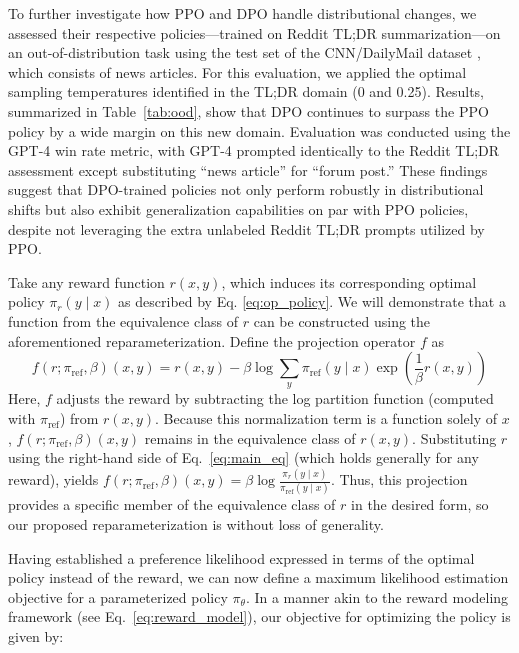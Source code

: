 To further investigate how PPO and DPO handle distributional changes, we assessed their respective policies—trained on Reddit TL;DR summarization—on an out-of-distribution task using the test set of the CNN/DailyMail dataset \citep{nallapati-etal-2016-abstractive}, which consists of news articles. For this evaluation, we applied the optimal sampling temperatures identified in the TL;DR domain (0 and 0.25). Results, summarized in Table~\ref{tab:ood}, show that DPO continues to surpass the PPO policy by a wide margin on this new domain. Evaluation was conducted using the GPT-4 win rate metric, with GPT-4 prompted identically to the Reddit TL;DR assessment except substituting “news article” for “forum post.” These findings suggest that DPO-trained policies not only perform robustly in distributional shifts but also exhibit generalization capabilities on par with PPO policies, despite not leveraging the extra unlabeled Reddit TL;DR prompts utilized by PPO.

\begin{sproof}
    Take any reward function $r(x, y)$, which induces its corresponding optimal policy $\pi_r(y \mid x)$ as described by Eq. \ref{eq:op_policy}. We will demonstrate that a function from the equivalence class of $r$ can be constructed using the aforementioned reparameterization. Define the projection operator $f$ as  
\begin{equation}
    f(r; \pi_\text{ref}, \beta)(x, y) = r(x, y) - \beta\log\sum_{y}\pi_\text{ref}(y\mid x)\exp\left(\frac{1}{\beta}r(x, y)\right)
\end{equation}
Here, $f$ adjusts the reward by subtracting the log partition function (computed with $\pi_\text{ref}$) from $r(x, y)$. Because this normalization term is a function solely of $x$, $f(r; \pi_\text{ref}, \beta)(x, y)$ remains in the equivalence class of $r(x, y)$. Substituting $r$ using the right-hand side of Eq.~\ref{eq:main_eq} (which holds generally for any reward), yields $f(r; \pi_\text{ref}, \beta)(x, y) = \beta \log \frac{\pi_r(y\mid x)}{\pi_\text{ref}(y\mid x)}$. Thus, this projection provides a specific member of the equivalence class of $r$ in the desired form, so our proposed reparameterization is without loss of generality.
\end{sproof}

Having established a preference likelihood expressed in terms of the optimal policy instead of the reward, we can now define a maximum likelihood estimation objective for a parameterized policy $\pi_\theta$. In a manner akin to the reward modeling framework (see Eq.~\ref{eq:reward_model}), our objective for optimizing the policy is given by:


